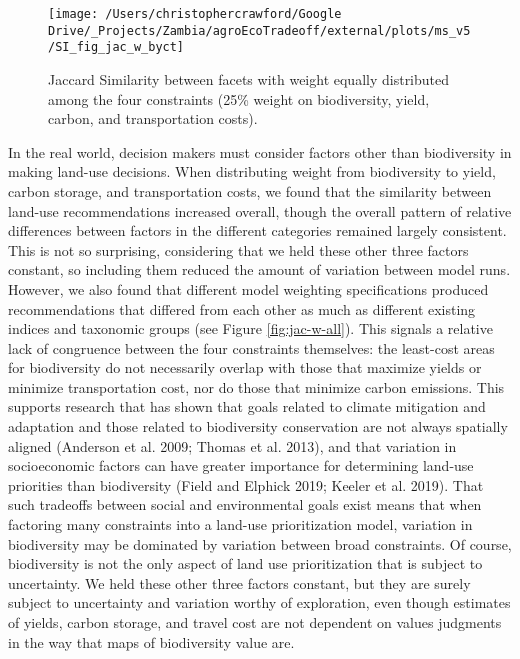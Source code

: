\documentclass[
]{article}
\begin{document}
\begin{figure}
\texttt{[image: /Users/christophercrawford/Google Drive/\_Projects/Zambia/agroEcoTradeoff/external/plots/ms\_v5/SI\_fig\_jac\_w\_byct]} \caption{Jaccard Similarity between facets with weight equally distributed among the four constraints (25\% weight on biodiversity, yield, carbon, and transportation costs).}\label{fig:jac-w-byct}
\end{figure}

In the real world, decision makers must consider factors other than biodiversity in making land-use decisions. When distributing weight from biodiversity to yield, carbon storage, and transportation costs, we found that the similarity between land-use recommendations increased overall, though the overall pattern of relative differences between factors in the different categories remained largely consistent. This is not so surprising, considering that we held these other three factors constant, so including them reduced the amount of variation between model runs. However, we also found that different model weighting specifications produced recommendations that differed from each other as much as different existing indices and taxonomic groups (see Figure \ref{fig:jac-w-all}). This signals a relative lack of congruence between the four constraints themselves: the least-cost areas for biodiversity do not necessarily overlap with those that maximize yields or minimize transportation cost, nor do those that minimize carbon emissions. This supports research that has shown that goals related to climate mitigation and adaptation and those related to biodiversity conservation are not always spatially aligned (Anderson et al. 2009; Thomas et al. 2013), and that variation in socioeconomic factors can have greater importance for determining land-use priorities than biodiversity (Field and Elphick 2019; Keeler et al. 2019). That such tradeoffs between social and environmental goals exist means that when factoring many constraints into a land-use prioritization model, variation in biodiversity may be dominated by variation between broad constraints. Of course, biodiversity is not the only aspect of land use prioritization that is subject to uncertainty. We held these other three factors constant, but they are surely subject to uncertainty and variation worthy of exploration, even though estimates of yields, carbon storage, and travel cost are not dependent on values judgments in the way that maps of biodiversity value are.

\newpage
\end{document}

